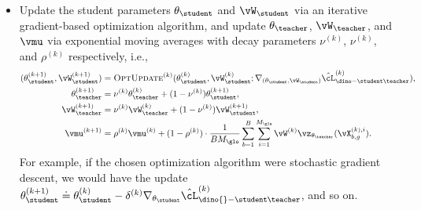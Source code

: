 \documentclass[../../book-main.tex]{subfiles}
\begin{document}
\begin{itemize}
\begin{align}
            \theta_{\teacher}, \vW_{\student}, \vW_{\teacher}, \vmu) \doteq \nonumber \\
            &\frac{1}{BM_{\glo}(M_{\glo} + M_{\loc} - 1)}\sum_{b =
            1}^{B}\sum_{i = 1}^{M_{\glo}}\Bigg[\sum_{j =
                1}^{M_{\loc}}d_{\CE}(\vp_{\theta_{\teacher},
                    \vW_{\teacher}, \vmu}(\vX_{b, g}^{(k), i}),
                    \vp_{\theta_{\student}, \vW_{\student}}(\vX_{b,
                \ell}^{(k), j})) \nonumber \\
                &\qquad+ \sum_{\substack{j = 1 \\ j \neq
                i}}^{M_{\glo}}d_{\CE}(\vp_{\theta_{\teacher},
                    \vW_{\teacher}, \vmu}(\vX_{b, g}^{(k), i}),
                    \vp_{\theta_{\student}, \vW_{\student}}(\vX_{b, g}^{(k),
            j}))\Bigg] ,
        \end{align}
        as well as its gradients with respect to
        \(\theta_{\student}\) and \(\vW_{\student}\), which should be
        computed under the assumption that \(\theta_{\teacher}\),
        \(\vW_{\teacher}\), and \(\vmu\) are constants --- namely
        that they are \textit{detached from the computational graph}
        and not dependent on \(\theta_{\student}\) and \(\vW_{\student}\).
    \item Update the student parameters \(\theta_{\student}\) and
        \(\vW_{\student}\) via an iterative gradient-based
        optimization algorithm, and update \(\theta_{\teacher}\),
        \(\vW_{\teacher}\), and \(\vmu\) via exponential moving
        averages with decay parameters \(\nu^{(k)}\), \(\nu^{(k)}\),
        and \(\rho^{(k)}\) respectively, i.e.,
        \begin{align}
            (\theta_{\student}^{(k + 1)}, \vW_{\student}^{(k + 1)})
            &= \textsc{OptUpdate}^{(k)}(\theta_{\student}^{(k)},
                \vW_{\student}^{(k)}; \nabla_{(\theta_{\student},
            \vW_{\student})}\hat{\cL}_{\dino-\student\teacher}^{(k)}) , \\
            \theta_{\teacher}^{(k + 1)}
            &= \nu^{(k)}\theta_{\teacher}^{(k)} + (1 -
            \nu^{(k)})\theta_{\student}^{(k + 1)} , \\
            \vW_{\teacher}^{(k + 1)}
            &= \nu^{(k)}\vW_{\teacher}^{(k)} + (1 -
            \nu^{(k)})\vW_{\student}^{(k + 1)} , \\
            \vmu^{(k + 1)}
            &= \rho^{(k)}\vmu^{(k)} + (1 -
            \rho^{(k)})\cdot\frac{1}{BM_{\glo}}\sum_{b =
            1}^{B}\sum_{i =
            1}^{M_{\glo}}\vW^{(k)}\vz_{\theta_{\teacher}}(\vX_{b, g}^{(k), i}) .
        \end{align}
        For example, if the chosen optimization algorithm were
        stochastic gradient descent, we would have the update
        \(\theta_{\student}^{(k + 1)} \doteq \theta_{\student}^{(k)}
            -
        \delta^{(k)}\nabla_{\theta_{\student}}\hat{\cL}_{\dino{}-\student\teacher}^{(k)}\),
        and so on.
\end{itemize}
\end{document}
